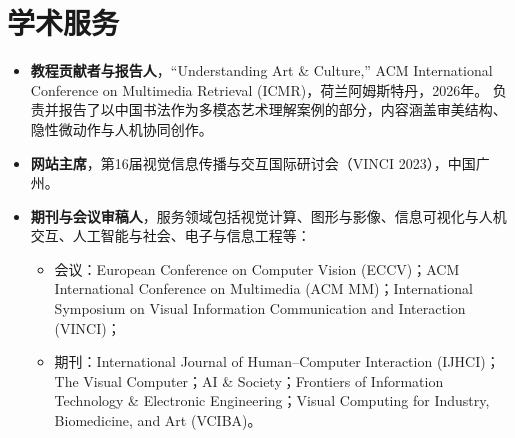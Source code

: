\section*{学术服务}

\begin{itemize}[leftmargin=*]
    \item \noindent\textbf{教程贡献者与报告人}，“Understanding Art \& Culture,” ACM International Conference on Multimedia Retrieval (ICMR)，荷兰阿姆斯特丹，2026年。
    负责并报告了以中国书法作为多模态艺术理解案例的部分，内容涵盖审美结构、隐性微动作与人机协同创作。

    \item \textbf{网站主席}，第16届视觉信息传播与交互国际研讨会（VINCI 2023），中国广州。
    \item \noindent \textbf{期刊与会议审稿人}，服务领域包括视觉计算、图形与影像、信息可视化与人机交互、人工智能与社会、电子与信息工程等：
    \begin{itemize}
         \item 会议：European Conference on Computer Vision (ECCV)；ACM International Conference on Multimedia (ACM MM)；International Symposium on Visual Information Communication and Interaction (VINCI)；
         \item 期刊：International Journal of Human--Computer Interaction (IJHCI)；The Visual Computer；AI \& Society；Frontiers of Information Technology \& Electronic Engineering；Visual Computing for Industry, Biomedicine, and Art (VCIBA)。
    \end{itemize}
\end{itemize}
